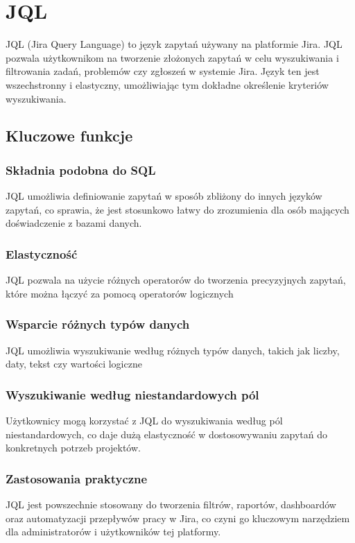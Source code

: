 \section{JQL}
\label{impl:jql}
JQL (Jira Query Language) to język zapytań używany na platformie Jira. JQL pozwala użytkownikom na tworzenie złożonych zapytań w celu wyszukiwania i filtrowania zadań, problemów czy zgłoszeń w systemie Jira. Język ten jest
wszechstronny i elastyczny, umożliwiając tym dokładne określenie kryteriów wyszukiwania.

\subsection{Kluczowe funkcje}
\subsubsection*{Składnia podobna do SQL}
JQL umożliwia definiowanie zapytań w sposób zbliżony do innych języków zapytań, co sprawia, że jest stosunkowo łatwy do zrozumienia dla osób mających doświadczenie z bazami danych.
\subsubsection*{Elastyczność}
JQL pozwala na użycie różnych operatorów do tworzenia precyzyjnych zapytań, które można łączyć za pomocą operatorów logicznych
\subsubsection*{Wsparcie różnych typów danych}
JQL umożliwia wyszukiwanie według różnych typów danych, takich jak liczby, daty, tekst czy wartości logiczne
\subsubsection*{Wyszukiwanie według niestandardowych pól}
Użytkownicy mogą korzystać z JQL do wyszukiwania według pól niestandardowych, co daje dużą elastyczność w dostosowywaniu zapytań do konkretnych potrzeb projektów.
\subsubsection*{Zastosowania praktyczne}
JQL jest powszechnie stosowany do tworzenia filtrów, raportów, dashboardów oraz automatyzacji przepływów pracy w Jira, co czyni go kluczowym narzędziem dla administratorów i użytkowników tej platformy.

